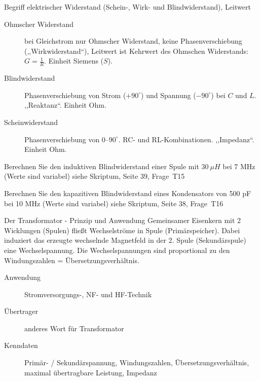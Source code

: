 \documentclass[avery5371,grid,frame,a4paper]{flashcards}
\newcommand{\card}[3]{
  \begin{flashcard}[{\chap} -- #1]{#2}#3\end{flashcard}
}
\begin{document}
\card{14}{Begriff elektrischer Widerstand (Schein-, Wirk- und Blindwiderstand), Leitwert}{
  \small
  \begin{description}
    \item[Ohmscher Widerstand] bei Gleichstrom nur Ohmscher Widerstand,
      keine Phasenverschiebung (,,Wirkwiderstand``),
      Leitwert ist Kehrwert des Ohmschen Widerstands: $G = \frac1{R}$. Einheit Siemens ($S$).
    \item[Blindwiderstand]
      Phasenverschiebung von Strom ($+90^\circ$) und Spannung ($-90^\circ$) bei $C$ und $L$.
      ,,Reaktanz``. Einheit Ohm.
    \item[Scheinwiderstand]
      Phasenverschiebung von 0--$90^\circ$. RC- und RL-Kombinationen. ,,Impedanz``. Einheit Ohm.
  \end{description}
}

\card{15}{Berechnen Sie den induktiven Blindwiderstand einer Spule mit $30~\mu H$ bei $7$ MHz (Werte sind variabel)}{
  \centering
  siehe Skriptum, Seite 39, Frage~T15
}

\card{16}{Berechnen Sie den kapazitiven Blindwiderstand eines Kondensators von 500 pF bei 10 MHz (Werte sind variabel)}{
  \centering
  siehe Skriptum, Seite 38, Frage~T16
}

\card{17}{Der Transformator - Prinzip und Anwendung}{
  \footnotesize
  Gemeinsamer Eisenkern mit 2 Wicklungen (Spulen) fließt Wechselströme in Spule (Primärspeicher).
  Dabei induziert das erzeugte wechselnde Magnetfeld in der 2. Spule (Sekundärspule)
  eine Wechselspannung. Die Wechselspannungen sind proportional zu den Windungszahlen
  = Übersetzungsverhältnis.
  \begin{description}
    \item[Anwendung] Stromversorgungs-, NF- und HF-Technik
    \item[Übertrager] anderes Wort für Transformator
    \item[Kenndaten]
      Primär- / Sekundärspannung, Windungszahlen, Übersetzungsverhältnis,
      maximal übertragbare Leistung, Impedanz
  \end{description}
}
\end{document}
